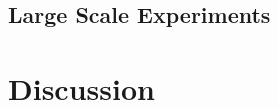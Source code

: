 \documentclass{article}
\begin{document}
\subsection{Large Scale Experiments}
\section{Discussion}








\cite{iht}
\cite{niht}
\cite{greedy_algorithms}
\nocite{langley00}



\end{document}
